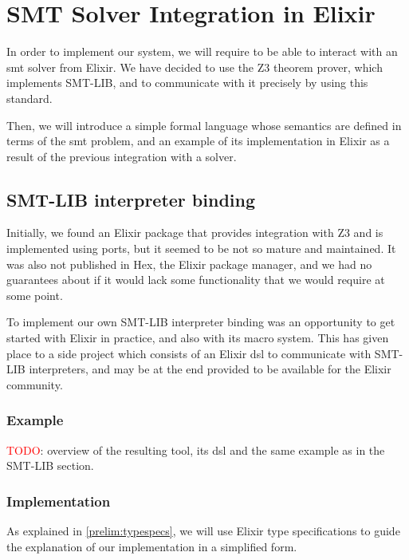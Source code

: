 \chapter{SMT Solver Integration in Elixir}
\label{cap:smtSolverIntegration}

In order to implement our system, we will require to be able to interact with
an \acrshort{smt} solver from Elixir. We have decided to use the Z3 theorem
prover, which implements SMT-LIB, and to communicate with it precisely by using
this standard.

Then, we will introduce a simple formal language whose semantics are defined
in terms of the \gls{smt} problem, and an example of its implementation in 
Elixir as a result of the previous integration with a solver.

\section{SMT-LIB interpreter binding}

Initially, we found an Elixir package that provides integration with Z3 and is
implemented using ports, but it seemed to be not so mature and maintained. It 
was also not published in Hex, the Elixir package manager, and we had no
guarantees about if it would lack some functionality that we would require at
some point.

To implement our own SMT-LIB interpreter binding was an opportunity to get
started with Elixir in practice, and also with its macro system. This has 
given place to a side project which consists of an Elixir \gls{dsl} to
communicate with SMT-LIB interpreters, and may be at the end provided to 
be available for the Elixir community.

\subsection{Example}
\label{integ:dslexample}

\textcolor{red}{TODO}: overview of the resulting tool, its \gls{dsl} and the same 
example as in the SMT-LIB section.

\subsection{Implementation}

As explained in \ref{prelim:typespecs}, we will use Elixir type specifications to guide 
the explanation of our implementation in a simplified form.

